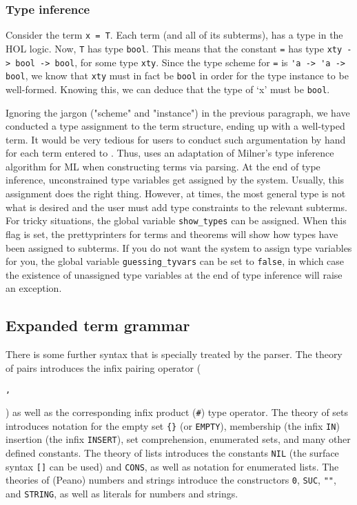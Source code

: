 {\subsubsection{Type inference}

Consider the term \verb+x = T+.  Each term (and all of its subterms),
has a type in the HOL logic. Now, \verb+T+ has type \verb+bool+. This
means that the constant \verb+=+ has type \verb+xty -> bool -> bool+,
for some type \verb+xty+. Since the type scheme for \verb+=+ is
\verb+'a -> 'a -> bool+, we know that \verb+xty+ must in fact be
\verb+bool+ in order for the type instance to be well-formed. Knowing
this, we can deduce that the type of `x' must be \verb+bool+.

Ignoring the jargon ("scheme" and "instance") in the previous
paragraph, we have conducted a type assignment to the term structure,
ending up with a well-typed term. It would be very tedious for users
to conduct such argumentation by hand for each term entered to \HOL{}.
Thus, \HOL{} uses an adaptation of Milner's type inference algorithm
for ML when constructing terms via parsing. At the end of type
inference, unconstrained type variables get assigned by the system.
Usually, this assignment does the right thing. However, at times, the
most general type is not what is desired and the user must add type
constraints to the relevant subterms. For tricky situations, the
global variable \verb+show_types+ can be assigned. When this flag is
set, the prettyprinters for terms and theorems will show how types
have been assigned to subterms. If you do not want the system to
assign type variables for you, the global variable
\verb+guessing_tyvars+ can be set to \verb+false+, in which case the
existence of unassigned type variables at the end of type inference
will raise an exception.

\subsection{Expanded term grammar}

There is some further syntax that is specially treated by the parser.
The theory of pairs introduces the infix pairing operator
(\begin{Large}\verb+,+\end{Large}) as well as the corresponding infix
product (\verb+#+) type operator. The theory of sets introduces
notation for the empty set \verb+{}+ (or \verb+EMPTY+), membership
(the infix \verb+IN+) insertion (the infix \verb+INSERT+), set
comprehension, enumerated sets, and many other defined constants. The
theory of lists introduces the constants \verb+NIL+ (the surface
syntax \verb+[]+ can be used) and \verb+CONS+, as well as notation for
enumerated lists. The theories of (Peano) numbers and strings
introduce the constructors \verb+0+, \verb+SUC+, \verb+""+, and
\verb+STRING+, as well as literals for numbers and strings.

}
